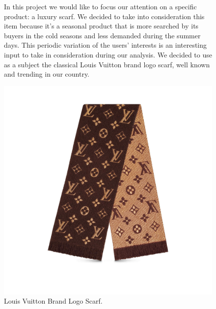 \begin{figure}[!htp] 
	\begin{flushleft}
		In this project we would like to focus our attention on a specific product: a luxury scarf. We decided to take into consideration this item because it's a seasonal product that is more searched by its buyers in the cold seasons and less demanded during the summer days. This periodic variation of the users' interests is an interesting input to take in consideration during our analysis. We decided to use as a subject the classical Louis Vuitton brand logo scarf, well known and trending in our country.
	\end{flushleft}
	\centering
	\includegraphics[width=0.8\linewidth]{sections/images/productLogo}
	\caption{Louis Vuitton Brand Logo Scarf.}
\end{figure}
\clearpage